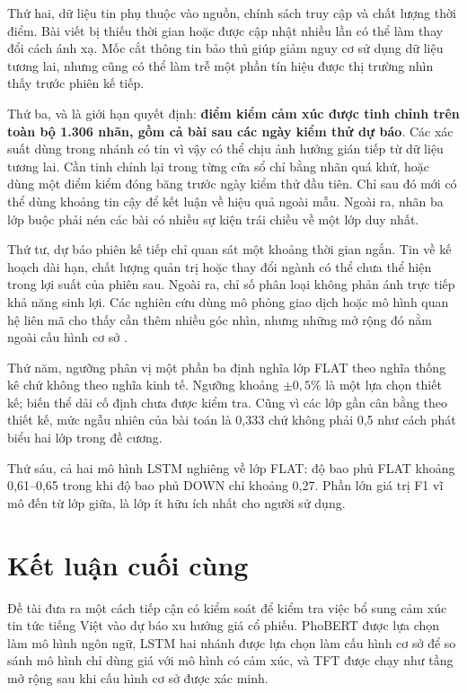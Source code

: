 Thứ hai, dữ liệu tin phụ thuộc vào nguồn, chính sách truy cập và chất lượng thời điểm.
Bài viết bị thiếu thời gian hoặc được cập nhật nhiều lần có thể làm thay đổi cách ánh xạ.
Mốc cắt thông tin bảo thủ giúp giảm nguy cơ sử dụng dữ liệu tương lai, nhưng cũng có thể
làm trễ một phần tín hiệu được thị trường nhìn thấy trước phiên kế tiếp.

Thứ ba, và là giới hạn quyết định: \textbf{điểm kiểm cảm xúc được tinh chỉnh trên toàn bộ
1.306 nhãn, gồm cả bài sau các ngày kiểm thử dự báo}. Các xác suất dùng trong nhánh có tin
vì vậy có thể chịu ảnh hưởng gián tiếp từ dữ liệu tương lai. Cần tinh chỉnh lại trong từng
cửa sổ chỉ bằng nhãn quá khứ, hoặc dùng một điểm kiểm đóng băng trước ngày kiểm thử đầu
tiên. Chỉ sau đó mới có thể dùng khoảng tin cậy để kết luận về hiệu quả ngoài mẫu. Ngoài
ra, nhãn ba lớp buộc phải nén các bài có nhiều sự kiện trái chiều về một lớp duy nhất.

Thứ tư, dự báo phiên kế tiếp chỉ quan sát một khoảng thời gian ngắn. Tin về kế hoạch dài
hạn, chất lượng quản trị hoặc thay đổi ngành có thể chưa thể hiện trong lợi suất của phiên
sau. Ngoài ra, chỉ số phân loại không phản ánh trực tiếp khả năng sinh lợi. Các nghiên cứu
dùng mô phỏng giao dịch hoặc mô hình quan hệ liên mã cho thấy cần thêm nhiều góc nhìn,
nhưng những mở rộng đó nằm ngoài cấu hình cơ sở
\cite{Chen2021_210708721v1,Xu2021_211013716v2}.

Thứ năm, ngưỡng phân vị một phần ba định nghĩa lớp FLAT theo nghĩa thống kê chứ không theo
nghĩa kinh tế. Ngưỡng khoảng $\pm0{,}5\%$ là một lựa chọn thiết kế; biến thể dải cố định
chưa được kiểm tra. Cũng vì các lớp gần cân bằng theo thiết kế, mức ngẫu nhiên của bài toán
là 0,333 chứ không phải 0,5 như cách phát biểu hai lớp trong đề cương.

Thứ sáu, cả hai mô hình LSTM nghiêng về lớp FLAT: độ bao phủ FLAT khoảng 0,61--0,65 trong khi
độ bao phủ DOWN chỉ khoảng 0,27. Phần lớn giá trị F1 vĩ mô đến từ lớp giữa, là lớp ít hữu ích
nhất cho người sử dụng.

\section{Kết luận cuối cùng}

Đề tài đưa ra một cách tiếp cận có kiểm soát để kiểm tra việc bổ sung cảm xúc tin tức
tiếng Việt vào dự báo xu hướng giá cổ phiếu. PhoBERT được lựa chọn làm mô hình ngôn ngữ,
LSTM hai nhánh được lựa chọn làm cấu hình cơ sở để so sánh mô hình chỉ dùng giá với mô
hình có cảm xúc, và TFT được chạy như tầng mở rộng sau khi cấu hình cơ sở được xác minh.


